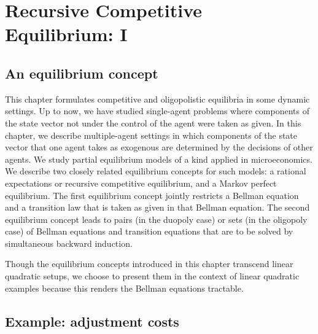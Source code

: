 

%





\def\toone{{t+1}}
\def\ttwo{{t+2}}
\def\tthree{{t+3}}
\def\Tone{{T+1}}
\def\TTT{{T-1}}
\def\rtr{{\rm tr}}

\chapter{Recursive Competitive Equilibrium: I \label{recurpe}}

\section{An equilibrium concept}

This chapter formulates competitive and oligopolistic
equilibria in some dynamic settings.
Up to now, we have studied  single-agent problems where
components of the state vector not under the control
of the agent were taken as given.  In this chapter, we
describe multiple-agent settings in which  components
of the state vector that one agent takes as exogenous are
determined by the decisions of other agents.   We study partial
equilibrium models of a kind applied in
microeconomics.    We describe
two closely related equilibrium  concepts for such models:
a rational expectations or recursive competitive  equilibrium,
and a Markov perfect equilibrium.   The first
equilibrium concept jointly restricts a Bellman equation and
a transition law that is taken as given in that Bellman
equation.  The second equilibrium concept leads
to pairs (in the duopoly case) or sets (in the oligopoly case)
 of Bellman equations  and transition equations that are  to be
solved by simultaneous backward induction.

   Though the equilibrium concepts introduced in this chapter
 transcend  linear quadratic setups, we choose to
present them in the context of linear quadratic examples
because this renders the    Bellman equations
 tractable.


\section{Example: adjustment costs}

